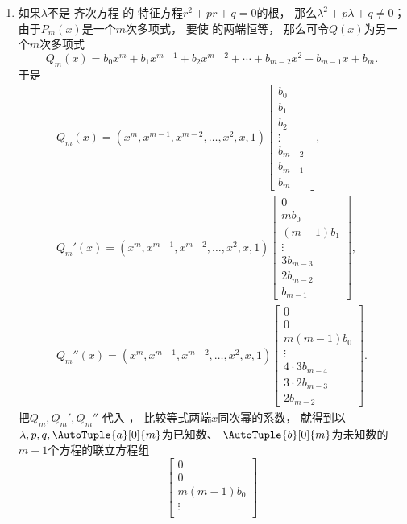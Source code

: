 \begin{enumerate}
	\item 如果\(\lambda\)不是
	齐次方程  的
	特征方程\(r^2+pr+q=0\)的根，
	那么\(\lambda^2+p\lambda+q\neq0\)；
	由于\(P_m(x)\)是一个\(m\)次多项式，
	要使  的两端恒等，
	那么可令\(Q(x)\)为另一个\(m\)次多项式\begin{equation}
		Q_m(x) = b_0 x^m + b_1 x^{m-1} + b_2 x^{m-2}
			+ \dotsb + b_{m-2} x^2 + b_{m-1} x + b_m.
	\end{equation}
	于是\begin{gather*}
		Q_m(x) = (x^m,x^{m-1},x^{m-2},\dotsc,x^2,x,1)
		\begin{bmatrix}
			b_0 \\ b_1 \\ b_2 \\ \vdots \\ b_{m-2} \\ b_{m-1} \\ b_m
		\end{bmatrix}, \\
		Q_m'(x) = (x^m,x^{m-1},x^{m-2},\dotsc,x^2,x,1)
		\begin{bmatrix}
			0 \\ m b_0 \\ (m-1) b_1 \\ \vdots \\
			3 b_{m-3} \\ 2 b_{m-2} \\ b_{m-1}
		\end{bmatrix}, \\
		Q_m''(x) = (x^m,x^{m-1},x^{m-2},\dotsc,x^2,x,1)
		\begin{bmatrix}
			0 \\ 0 \\ m(m-1) b_0 \\ \vdots \\
			4\cdot3 b_{m-4} \\ 3\cdot2 b_{m-3} \\ 2 b_{m-2}
		\end{bmatrix}.
	\end{gather*}
	把\(Q_m,Q_m',Q_m''\)
	代入 ，
	比较等式两端\(x\)同次幂的系数，
	就得到以\(\lambda,p,q,\AutoTuple{a}[0]{m}\)为已知数、
	\(\AutoTuple{b}[0]{m}\)为未知数的\(m+1\)个方程的联立方程组\[
		\begin{bmatrix}
			0 \\ 0 \\ m(m-1) b_0 \\ \vdots \\

\end{bmatrix}\]
\end{enumerate}
